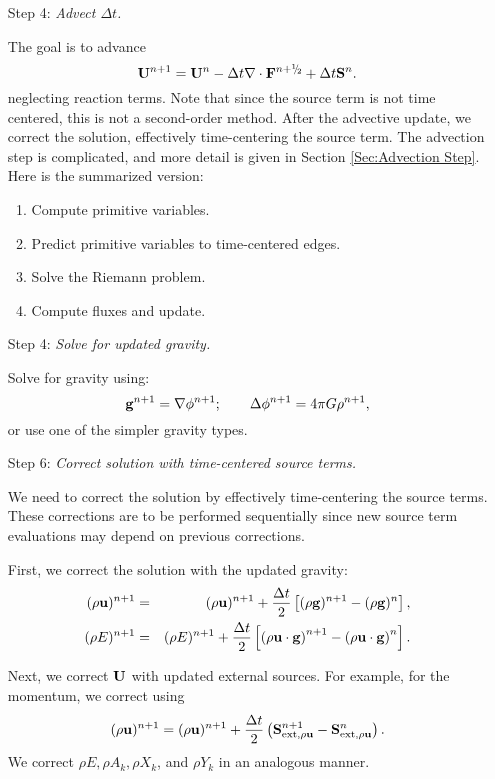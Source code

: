 \begin{enumerate}
\item[Step 4:] {\em Advect $\Delta t$.}

The goal is to advance
\begin{equation}
\Ub^{n+1} = \Ub^n - \dt\nabla\cdot\Fb^\nph + \dt\Sb^n.
\end{equation}
neglecting reaction terms.  Note that since the source term is not
time centered, this is not a second-order method.  After the advective
update, we correct the solution, effectively time-centering the source
term. The advection step is complicated, and more detail is given in
Section \ref{Sec:Advection Step}.  Here is the summarized version:
\begin{enumerate}
\item Compute primitive variables.
\item Predict primitive variables to time-centered edges.
\item Solve the Riemann problem.
\item Compute fluxes and update.
\end{enumerate}
\item[Step 4:] {\em Solve for updated gravity.}

Solve for gravity using:
\begin{equation}
{\bf g}^{n+1} = \nabla\phi^{n+1}; \qquad \Delta\phi^{n+1} = 4\pi G\rho^{n+1},
\end{equation}
or use one of the simpler gravity types.
\item[Step 6:] {\em Correct solution with time-centered source terms.}

We need to correct the solution by effectively time-centering the
source terms.  These corrections are to be performed sequentially
since new source term evaluations may depend on previous corrections.

First, we correct the solution with the updated gravity:
\begin{eqnarray}
(\rho{\bf u})^{n+1} &=& (\rho{\bf u})^{n+1} + \frac{\Delta t}{2}\left[(\rho{\bf g})^{n+1} - (\rho{\bf g})^n\right], \\
(\rho E)^{n+1} &=& (\rho E)^{n+1} + \frac{\Delta t}{2}\left[\left(\rho{\bf u}\cdot{\bf g}\right)^{n+1} - \left(\rho{\bf u}\cdot{\bf g}\right)^n\right].
\end{eqnarray}

Next, we correct ${\bf U}$ with updated external sources.  For example,
for the momentum, we correct using
\begin{equation}
(\rho{\bf u})^{n+1} = (\rho{\bf u})^{n+1} + \frac{\Delta t}{2}\left({\bf S}_{{\rm ext},\rho{\bf u}}^{n+1} - {\bf S}_{{\rm ext},\rho{\bf u}}^n\right).
\end{equation}
We correct $\rho E, \rho A_k, \rho X_k$, and $\rho Y_k$ in an
analogous manner.


\end{enumerate}
